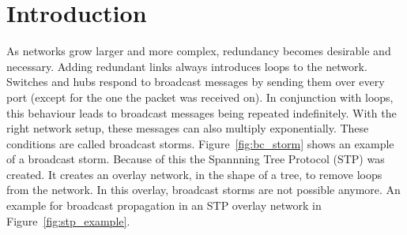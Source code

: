\chapter{Introduction}
As networks grow larger and more complex, redundancy becomes desirable and necessary.
Adding redundant links always introduces loops to the network.
Switches and hubs respond to broadcast messages by sending them over every port (except for the one the packet was received on).
In conjunction with loops, this behaviour leads to broadcast messages being repeated indefinitely.
With the right network setup, these messages can also multiply exponentially. 
These conditions are called broadcast storms\cite{bstorm}.
Figure~\ref{fig:bc_storm} shows an example of a broadcast storm.
Because of this the Spannning Tree Protocol (STP)\cite{perlman85} was created.
It creates an overlay network, in the shape of a tree, to remove loops from the network.
In this overlay, broadcast storms are not possible anymore.
An example for broadcast propagation in an STP overlay network in Figure~\ref{fig:stp_example}.


